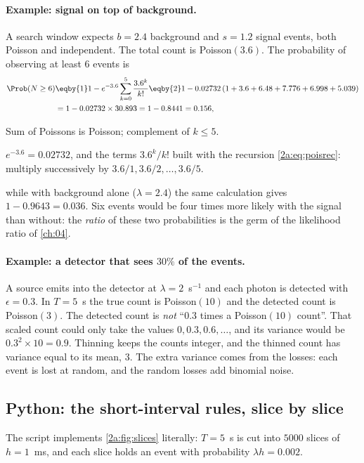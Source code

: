 \paragraph{Example: signal on top of background.}
A search window expects $b=2.4$ background and $s=1.2$ signal events, both Poisson and independent. The total count is Poisson$(3.6)$. The probability of observing at least $6$ events is
\begin{align*}
  \Prob(N\ge6) &\eqby{1} 1-e^{-3.6}\sum_{k=0}^5\frac{3.6^k}{k!}
  \eqby{2} 1-0.02732\,(1+3.6+6.48+7.776+6.998+5.039) \\
  &= 1-0.02732\times30.893 = 1-0.8441 = 0.156 ,
\end{align*}
\begin{explain}
  \item Sum of Poissons is Poisson; complement of $k\le5$.
  \item $e^{-3.6}=0.02732$, and the terms $3.6^k/k!$ built with the recursion \eqref{2a:eq:poisrec}: multiply successively by $3.6/1,3.6/2,\dots,3.6/5$.
\end{explain}
while with background alone ($\lambda=2.4$) the same calculation gives $1-0.9643=0.036$. Six events would be four times more likely with the signal than without: the \emph{ratio} of these two probabilities is the germ of the likelihood ratio of \cref{ch:04}.

\paragraph{Example: a detector that sees $30\%$ of the events.}
A source emits into the detector at $\lambda=2$~s$^{-1}$ and each photon is detected with $\epsilon=0.3$. In $T=5$~s the true count is Poisson$(10)$ and the detected count is Poisson$(3)$. The detected count is \emph{not} ``$0.3$ times a Poisson$(10)$ count''. That scaled count could only take the values $0,0.3,0.6,\dots$, and its variance would be $0.3^2\times10=0.9$. Thinning keeps the counts integer, and the thinned count has variance equal to its mean, $3$. The extra variance comes from the losses: each event is lost at random, and the random losses add binomial noise.

\subsection{Python: the short-interval rules, slice by slice}

The script  implements \cref{2a:fig:slices} literally: $T=5$~s is cut into $5000$ slices of $h=1$~ms, and each slice holds an event with probability $\lambda h=0.002$.

